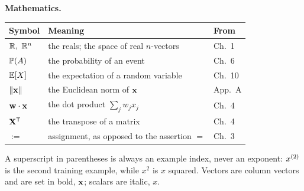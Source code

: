 \vspace{6pt}
\noindent\textbf{Mathematics.}
\begin{center}
\small
\renewcommand{\arraystretch}{1.25}
\begin{tabular}{@{}L{2.6cm}L{7.4cm}L{1.6cm}@{}}
\toprule
\textbf{Symbol} & \textbf{Meaning} & \textbf{From}\\
\midrule
$\mathbb{R},\ \mathbb{R}^{n}$     & the reals; the space of real $n$-vectors & Ch.\ 1\\
$\mathbb{P}(A)$          & the probability of an event & Ch.\ 6\\
$\mathbb{E}[X]$           & the expectation of a random variable & Ch.\ 10\\
$\|\mathbf{x}\|$           & the Euclidean norm of $\mathbf{x}$ & App.\ A\\
$\mathbf{w}\cdot\mathbf{x}$       & the dot product $\sum_j w_j x_j$ & Ch.\ 4\\
$\mathbf{X}^{\mathsf{T}}$ & the transpose of a matrix & Ch.\ 4\\
$:=$                & assignment, as opposed to the assertion $=$ & Ch.\ 3\\
\bottomrule
\end{tabular}
\end{center}

\vspace{6pt}
\noindent A superscript in parentheses is always an example index, never an
exponent: $x^{(2)}$ is the second training example, while $x^2$ is $x$ squared.
Vectors are column vectors and are set in bold, $\mathbf{x}$; scalars are italic, $x$.

\cleardoublepage

